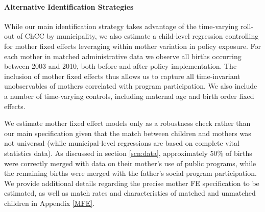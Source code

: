 \documentclass[12pt]{article}
\begin{document}
\begin{spacing}{1.4}
\paragraph{Alternative Identification Strategies}
While our main identification strategy takes advantage of
the time-varying roll-out of ChCC by municipality,
we also estimate a child-level regression controlling for mother
fixed effects leveraging within mother variation in policy exposure.
For each mother in matched administrative data we observe all
births occurring between 2003 and 2010, both before and after policy
implementation.  The inclusion of mother fixed effects thus allows
us to capture all time-invariant unobservables of mothers correlated
with program participation.  We also include a number of time-varying
controls, including maternal age and birth order fixed effects.

We estimate mother fixed effect models only as a robustness check
rather than our main specification given that the match between
children and mothers was not universal (while municipal-level
regressions are based on complete vital statistics data).  As
discussed in section \ref{scn:data}, approximately 50\% of births
were correctly merged with data on their mother's use of public
programs, while the remaining births were merged with the father's
social program participation. We provide additional details regarding
the precise mother FE specification to be estimated, as well as match
rates and characteristics of matched and unmatched children in
Appendix \ref{MFE}.


\end{spacing}
\end{document}
